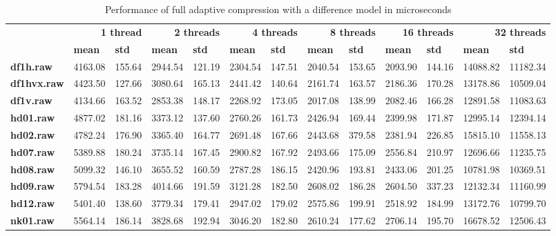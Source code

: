 \begin{table}[ht!]
\centering
\small
\begin{tabular}{l|ll|ll|ll|ll|ll|ll}
    & \multicolumn{2}{r|}{\textbf{1 thread}} & \multicolumn{2}{r|}{\textbf{2 threads}} & \multicolumn{2}{r|}{\textbf{4 threads}} & \multicolumn{2}{r|}{\textbf{8 threads}} & \multicolumn{2}{r|}{\textbf{16 threads}} & \multicolumn{2}{r}{\textbf{32 threads}} \\
    & \textbf{mean} & \textbf{std} & \textbf{mean} & \textbf{std} & \textbf{mean} & \textbf{std} & \textbf{mean} & \textbf{std} & \textbf{mean} & \textbf{std} & \textbf{mean} & \textbf{std} \\
\hline
    \textbf{df1h.raw} & 4163.08 & 155.64 & 2944.54 & 121.19 & 2304.54 & 147.51 & 2040.54 & 153.65 & 2093.90 & 144.16 & 14088.82 & 11182.34 \\
    \textbf{df1hvx.raw} & 4423.50 & 127.66 & 3080.64 & 165.13 & 2441.42 & 140.64 & 2161.74 & 163.57 & 2186.36 & 170.28 & 13178.86 & 10509.04 \\
    \textbf{df1v.raw} & 4134.66 & 163.52 & 2853.38 & 148.17 & 2268.92 & 173.05 & 2017.08 & 138.99 & 2082.46 & 166.28 & 12891.58 & 11083.63 \\
    \textbf{hd01.raw} & 4877.02 & 181.16 & 3373.12 & 137.60 & 2760.26 & 161.73 & 2426.94 & 169.44 & 2399.98 & 171.87 & 12995.14 & 12394.14 \\
    \textbf{hd02.raw} & 4782.24 & 176.90 & 3365.40 & 164.77 & 2691.48 & 167.66 & 2443.68 & 379.58 & 2381.94 & 226.85 & 15815.10 & 11558.13 \\
    \textbf{hd07.raw} & 5389.88 & 180.24 & 3735.14 & 167.45 & 2900.82 & 167.92 & 2493.66 & 175.09 & 2556.84 & 210.97 & 12696.66 & 11235.75 \\
    \textbf{hd08.raw} & 5099.32 & 146.10 & 3655.52 & 160.59 & 2787.28 & 186.15 & 2420.96 & 193.81 & 2433.06 & 201.25 & 10781.98 & 10369.51 \\
    \textbf{hd09.raw} & 5794.54 & 183.28 & 4014.66 & 191.59 & 3121.28 & 182.50 & 2608.02 & 186.28 & 2604.50 & 337.23 & 12132.34 & 11160.99 \\
    \textbf{hd12.raw} & 5401.40 & 138.60 & 3779.34 & 179.41 & 2947.02 & 179.02 & 2575.86 & 199.91 & 2518.92 & 184.99 & 13172.76 & 10799.70 \\
    \textbf{nk01.raw} & 5564.14 & 186.14 & 3828.68 & 192.94 & 3046.20 & 182.80 & 2610.24 & 177.62 & 2706.14 & 195.70 & 16678.52 & 12506.43 \\
\end{tabular}
\caption{Performance of full adaptive compression with a difference model in microseconds}
\end{table}
